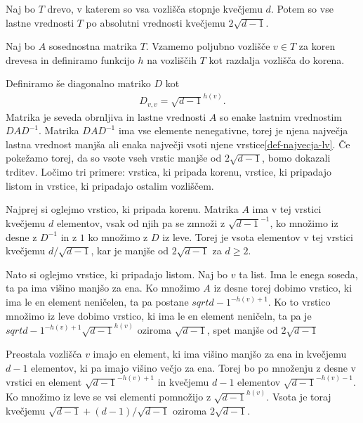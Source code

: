 \begin{izrek}\label{lastne-vrednosti-drevesa}
    Naj bo \(T\) drevo, v katerem so vsa vozlišča stopnje kvečjemu \(d\). Potem so vse lastne vrednosti \(T\) po absolutni vrednosti kvečjemu \(2\sqrt{d-1}\).
\end{izrek}
\begin{dokaz}
    Naj bo \(A\) sosednostna matrika \(T\). Vzamemo poljubno vozlišče \(v\in T\) za koren drevesa in definiramo funkcijo \(h\) na vozliščih \(T\) kot razdalja vozlišča do korena.

    Definiramo še diagonalno matriko \(D\) kot
    \begin{align*}
        D_{v, v} = \sqrt{d-1}^{h(v)}.
    \end{align*}
    Matrika je seveda obrnljiva in lastne vrednosti \(A\) so enake lastnim vrednostim \(D A D^{-1}\). Matrika \(DAD^{-1}\) ima vse elemente nenegativne, torej je njena največja lastna vrednost manjša ali enaka največji vsoti njene vrstice\ref{def-najvecja-lv}. Če pokežamo torej, da so vsote vseh vrstic manjše od \(2\sqrt{d-1}\), bomo dokazali trditev. Ločimo tri primere: vrstica, ki pripada korenu, vrstice, ki pripadajo listom in vrstice, ki pripadajo ostalim vozliščem.

    Najprej si oglejmo vrstico, ki pripada korenu. Matrika \(A\) ima v tej vrstici kvečjemu \(d\) elementov, vsak od njih pa se zmnoži z \(\sqrt{d-1}^{-1}\), ko množimo iz desne z \(D^{-1}\) in z \(1\) ko množimo z \(D\) iz leve. Torej je vsota elementov v tej vrstici kvečjemu \(d/\sqrt{d-1}\), kar je manjše od \(2\sqrt{d-1}\) za \(d\geq 2\).

    Nato si oglejmo vrstice, ki pripadajo listom. Naj bo \(v\) ta list. Ima le enega soseda, ta pa ima višino manjšo za ena. Ko množimo \(A\) iz desne torej dobimo vrstico, ki ima le en element neničelen, ta pa postane \(sqrt{d-1}^{-h(v)+1}\). Ko to vrstico množimo iz leve dobimo vrstico, ki ima le en element neničeln, ta pa je \(sqrt{d-1}^{-h(v)+1}\sqrt{d-1}^{h(v)}\) oziroma \(\sqrt{d-1}\), spet manjše od \(2\sqrt{d-1}\)

    Preostala vozlišča \(v\) imajo en element, ki ima višino manjšo za ena in kvečjemu \(d-1\) elementov, ki pa imajo višino večjo za ena. Torej bo po množenju z desne v vrstici en element \(\sqrt{d-1}^{-h(v)+1}\) in kvečjemu \(d-1\) elementov \(\sqrt{d-1}^{-h(v)-1}\). Ko množimo iz leve se vsi elementi pomnožijo z \(\sqrt{d-1}^{h(v)}\). Vsota je toraj kvečjemu \(\sqrt{d-1} + (d-1)/\sqrt{d-1}\) oziroma \(2\sqrt{d-1}\).
\end{dokaz}

